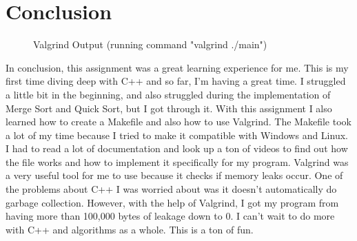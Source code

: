 \documentclass[letterpaper, 10pt]{article}
\begin{document}
\section{Conclusion}
\setcounter{figure}{0}
\begin{figure}[H] 
    \centering 
    \caption{Valgrind Output (running command "valgrind ./main")}
    \label{fig:figure5-1}
\end{figure}

\noindent
In conclusion, this assignment was a great learning experience for me. This is my first time diving deep with C++ and so far, I'm having a great time. I struggled a little bit in the beginning, and also struggled during the implementation of Merge Sort and Quick Sort, but I got through it. With this assignment I also learned how to create a Makefile and also how to use Valgrind. The Makefile took a lot of my time because I tried to make it compatible with Windows and Linux. I had to read a lot of documentation and look up a ton of videos to find out how the file works and how to implement it specifically for my program. Valgrind was a very useful tool for me to use because it checks if memory leaks occur. One of the problems about C++ I was worried about was it doesn't automatically do garbage collection. However, with the help of Valgrind, I got my program from having more than 100,000 bytes of leakage down to 0. I can't wait to do more with C++ and algorithms as a whole. This is a ton of fun.
\end{document}

